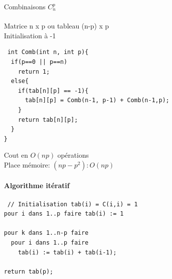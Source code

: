 \begin{exercice}{Combinaisons $C_n^p$}
\paragraph{}
Matrice n x p ou tableau (n-p) x p\\
Initialisation à -1

\begin{verbatim}
 int Comb(int n, int p){
  if(p==0 || p==n)
    return 1;
  else{
    if(tab[n][p] == -1){
      tab[n][p] = Comb(n-1, p-1) + Comb(n-1,p);
    }
    return tab[n][p];
  }
}
\end{verbatim}

Cout en $O(np)$ opérations\\
Place mémoire: $(np - p^2) : O(np)$

\paragraph{Algorithme itératif}
\begin{verbatim}
 // Initialisation tab(i) = C(i,i) = 1
pour i dans 1..p faire tab(i) := 1

pour k dans 1..n-p faire
  pour i dans 1..p faire
    tab(i) := tab(i) + tab(i-1);

return tab(p);
\end{verbatim}



\end{exercice}



